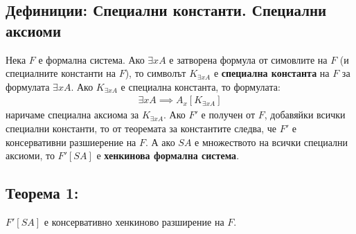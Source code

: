 \documentclass[french]{article}
\begin{document}
\subsection*{Дефиниции: Специални константи. Специални аксиоми}
Нека $F$ е формална система. Ако $\exists x A$ е затворена формула от симовлите на $F$ (и специалните константи на $F$), то символът $K_{\exists x A}$ е \textbf{специална константа} на $F$ за формулата $\exists x A$. \newline
Ако $K_{\exists x A}$ е специална константа, то формулата: 
\begin{align*}
\exists x A \implies A_x[K_{\exists x A}]
\end{align*}
наричаме $\textbf{специална аксиома}$ за $K_{\exists x A}$.\newline\newline
Ако $F'$ е получен от $F$, добавяйки всички специални константи, то от $\textbf{теоремата за константите}$ следва, че $F'$ е консервативни разшиерение на $F$. А ако $SA$ е множеството на всички специални аксиоми, то $F'[SA]$ е \textbf{хенкинова формална система}.

\subsection*{Теорема 1:} $F'[SA]$ е консервативно хенкиново разширение на $F$.
\end{document}
